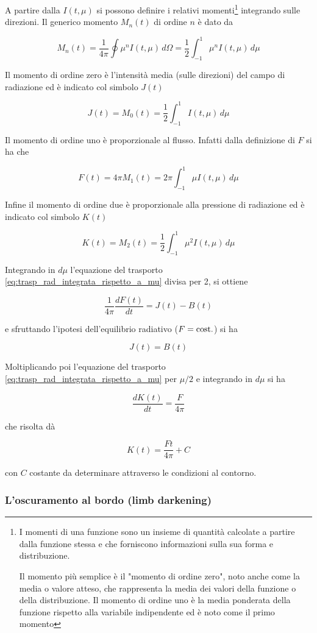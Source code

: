 A partire dalla $I(t,\mu)$ si possono definire i relativi momenti\footnote{I momenti di una funzione sono un insieme di quantità calcolate a partire dalla funzione stessa e che forniscono informazioni sulla sua forma e distribuzione.

Il momento più semplice è il "momento di ordine zero", noto anche come la media o valore atteso, che rappresenta la media dei valori della funzione o della distribuzione. Il momento di ordine uno è la media ponderata della funzione rispetto alla variabile indipendente ed è noto come il primo momento} integrando sulle
direzioni. Il generico momento $M_n(t)$ di ordine $n$ è dato da

$$M_n(t)=\frac{1}{4 \pi} \oint \mu^n I(t,\mu) \, d\Omega
=\frac{1}{2} \int_{-1}^{1} \mu^n I(t,\mu) \, d\mu$$

Il momento di ordine zero è l'intensità media (sulle direzioni) del campo di radiazione ed è indicato col simbolo $J(t)$

$$J(t)=M_0(t)=\frac{1}{2}\int_{-1}^{1} I(t,\mu) \, d\mu$$

Il momento di ordine uno è proporzionale al flusso. Infatti dalla definizione di $F$ si ha che

$$F(t)=4 \pi M_1(t)=2 \pi \int_{-1}^{1} \mu I(t,\mu) \, d\mu$$

Infine il momento di ordine due è proporzionale alla pressione di radiazione ed è indicato col simbolo $K(t)$

$$K(t)=M_2(t)=\frac{1}{2} \int_{-1}^{1} \mu^2 I(t,\mu) \, d\mu$$

Integrando in $d\mu$ l'equazione del trasporto \eqref{eq:trasp_rad_integrata_rispetto_a_mu} divisa per 2, si ottiene

$$\frac{1}{4 \pi} \frac{dF(t)}{dt}=J(t) - B(t)$$

e sfruttando l'ipotesi dell'equilibrio radiativo ($F=\rm cost.$) si ha

$$J(t)=B(t)$$

Moltiplicando poi l'equazione del trasporto \eqref{eq:trasp_rad_integrata_rispetto_a_mu} per $\mu/2$ e integrando in $d\mu$ si ha

$$\frac{dK(t)}{dt}=\frac{F}{4 \pi}$$

che risolta dà

$$K(t)=\frac{Ft}{4 \pi} + C$$

con $C$ costante da determinare attraverso le condizioni al contorno.

\subsubsection{L'oscuramento al bordo (limb darkening)}

